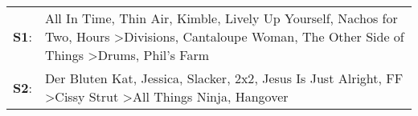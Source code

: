 \begin{supertabular}{p{0.03\textwidth}p{0.92\textwidth}}
 \textbf{S1}:  &  All In Time\textsuperscript{}, \enspace Thin Air\textsuperscript{}, \enspace Kimble\textsuperscript{}, \enspace Lively Up Yourself\textsuperscript{}, \enspace Nachos for Two\textsuperscript{}, \enspace Hours\textsuperscript{} \textgreater \enspace Divisions\textsuperscript{}, \enspace Cantaloupe Woman\textsuperscript{}, \enspace The Other Side of Things\textsuperscript{} \textgreater \enspace Drums\textsuperscript{}, \enspace Phil's Farm\textsuperscript{}  \enspace  \\
 \textbf{S2}:  &                                                                                                  Der Bluten Kat\textsuperscript{}, \enspace Jessica\textsuperscript{}, \enspace Slacker\textsuperscript{}, \enspace 2x2\textsuperscript{}, \enspace Jesus Is Just Alright\textsuperscript{}, \enspace FF\textsuperscript{} \textgreater \enspace Cissy Strut\textsuperscript{} \textgreater \enspace All Things Ninja\textsuperscript{}, \enspace Hangover\textsuperscript{}  \enspace  \\
\end{supertabular}
